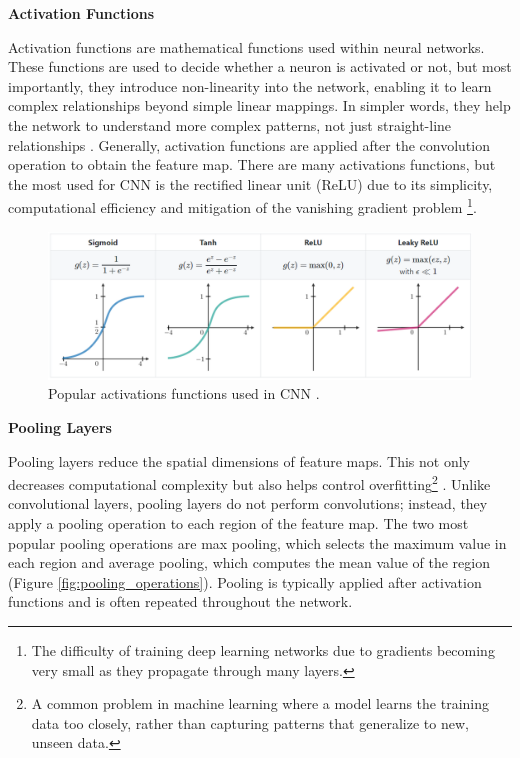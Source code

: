 \documentclass[a4paper,10pt]{book}
\begin{document}
\textbf{Activation Functions}

Activation functions are mathematical functions used within neural networks. These functions are used to decide whether a neuron is activated or not, but most importantly, they introduce non-linearity into the network, enabling it to learn complex relationships beyond simple linear mappings. In simpler words, they help the network to understand more complex patterns, not just straight-line relationships \cite{langActivationFunctionsNeural2024}. Generally, activation functions are applied after the convolution operation to obtain the feature map. There are many activations functions, but the most used for CNN is the rectified linear unit (ReLU) due to its simplicity, computational efficiency and mitigation of the vanishing gradient problem \footnote{The difficulty of training deep learning networks due to gradients becoming very small as they propagate through many layers.}.

\begin{figure}
    \centering
    \includegraphics[width=1.0\linewidth]{reports//assets/activations_functions.png}
    \caption[Popular activation functions]{Popular activations functions used in CNN \cite{wachtelUnderstandingActivationFunctions2021}.}
    \label{fig:activations-functions}
\end{figure}

\textbf{Pooling Layers}

Pooling layers reduce the spatial dimensions of feature maps. This not only decreases computational complexity but also helps control overfitting\footnote{A common problem in machine learning where a model learns the training data too closely, rather than capturing patterns that generalize to new, unseen data.} \cite{brownlee_gentle_2019}. Unlike convolutional layers, pooling layers do not perform convolutions; instead, they apply a pooling operation to each region of the feature map. The two most popular pooling operations are max pooling, which selects the maximum value in each region and average pooling, which computes the mean value of the region (Figure \ref{fig:pooling_operations}). Pooling is typically applied after activation functions and is often repeated throughout the network. 
\end{document}
